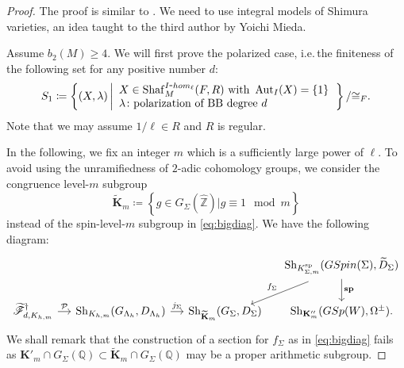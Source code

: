 \documentclass[11pt,reqno,oneside]{amsart}
\numberwithin{equation}{section}
\theoremstyle{definition}
\DeclareMathOperator{\Aut}{Aut}
\newcommand{\GSpin}{{\rm GSpin}}
\newcommand{\GSp}{{\rm GSp}}
\newcommand{\Sh}{\mathrm{Sh}}
\renewcommand{\hom}{{\rm hom}}
\newcommand{\Sha}{\mathrm{Shaf}}
\newcommand{\scF}{\mathscr{F}}
\newcommand\spin{{\bf sp}}
\newcommand{\QQ}{\mathbb{Q}}
\newcommand{\ZZ}{\mathbb{Z}}
\begin{document}
\begin{proof} 
The proof is similar to \cite[Section 4]{Takamatsu2020K3}. We need to use integral models of Shimura varieties, an idea taught to the third author by Yoichi Mieda. 

  Assume $b_2(M)\geq 4$. We will first prove the polarized case, i.e.\,the finiteness of the following set for any positive number $d$:
\begin{equation}
S_1\coloneqq \left\{
  (X, \lambda) \left|
  \begin{array}{l}
  X \in \Sha_M^{I \hbox{-}\hom_\ell}(F,R) \text{ with } \Aut_{I}(X)=\{1\}  \\
  \lambda \colon \text{polarization of BB degree} \ d
  \end{array}
  \right.
\right\}/{\cong_F}.
\end{equation}
Note that we may assume $1/\ell \in R$ and $R$ is regular.



In the following, we fix an integer $m$ which is a sufficiently large power of $\ell$. To avoid using the unramifiedness of $2$-adic cohomology groups, we consider the congruence level-$m$ subgroup
\[
\widetilde{\mathbf{K}}_m \coloneqq \left\{g \in G_\Sigma(\widehat{\ZZ}) \big| g \equiv 1~\bmod m \right\}
\]
instead of the spin-level-$m$ subgroup  in \eqref{eq:bigdiag}.
We have the following diagram:
\[
\begin{tikzcd}[column sep = small]
      & & & \Sh_{K^{\operatorname{sp}}_{\Sigma,m}}(\GSpin(\Sigma), \widetilde{D}_{\Sigma}) \ar[d,"\spin"] \ar[ld, shift left,"f_\Sigma"'] \\
\widetilde{\scF}^{\dag}_{d,K_{h,m}} \ar[r,"\mathcal{P}"] & \Sh_{K_{h,m}}(G_{\Lambda_h},D_{\Lambda_h}) \ar[r,"j_{\Sigma}"] & \Sh_{\widetilde{\mathbf{K}}_m}(G_\Sigma, D_{\Sigma})   & \Sh_{\mathbf{K}''_m}(\GSp(W), \Omega^{\pm}).
\end{tikzcd}
\]
We shall remark that the construction of a section for $f_\Sigma$ as in \eqref{eq:bigdiag}  fails as $\mathbf{K}'_m \cap G_{\Sigma}(\QQ) \subset \widetilde{\mathbf{K}}_m \cap G_{\Sigma}(\QQ)$ may be a proper arithmetic subgroup.


\end{proof}
\end{document}
